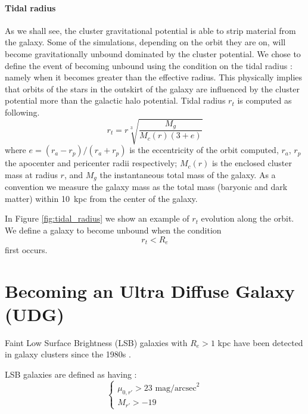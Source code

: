 \paragraph*{Tidal radius}
As we shall see, the cluster gravitational potential is able to strip material from the galaxy. Some of the simulations, depending on the orbit they are on, will become gravitationally unbound dominated by the cluster potential.
We chose to define the event of becoming unbound using the condition on the tidal radius \cite{King1962}: namely when it becomes greater than the effective radius.
This physically implies that orbits of the stars in the outskirt of the galaxy are influenced by the cluster potential more than the galactic halo potential. 
Tidal radius $r_t$ is computed as following.
\begin{equation}
r_t = r \sqrt[3]{\frac{M_g}{M_c(r) (3+e)}}
\label{eq:tidal_radius}
\end{equation}
where $e = (r_a - r_p) / (r_a + r_p)$ is the eccentricity of the orbit computed, $r_a$, $r_p$ the apocenter and pericenter radii respectively; $M_c(r)$ is the enclosed cluster mass at radius $r$, and $M_g$ the instantaneous total mass of the galaxy.
As a convention we measure the galaxy mass as the total mass (baryonic and dark matter) within 10~kpc from the center of the galaxy.

In Figure \ref{fig:tidal_radius} we show an example of $r_t$ evolution along the orbit. %
We define a galaxy to become unbound when the condition 
\begin{equation}
    r_t<R_e
\label{eq:tidal_radius_condition}
\end{equation}
first occurs.

\section{Becoming an Ultra Diffuse Galaxy (UDG)}
\label{sec:UDG}

Faint Low Surface Brightness (LSB) galaxies with $R_e > 1$ kpc have been detected in galaxy clusters since the 1980s \citep[e.g.][]{Sandage1984}.

LSB galaxies are defined as having \citep{Venhola2017}:
\begin{equation}
\begin{cases}
 \mu_{0,r'} > 23 \mbox{ mag/arcsec}^2\\
 M_{r'} > -19
\end{cases}
\end{equation}

